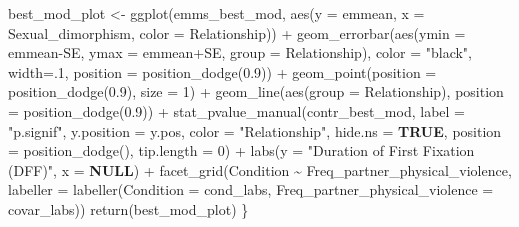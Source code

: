 \documentclass[
  bookmarksnumbered]{article}
\newenvironment{Shaded}{\begin{snugshade}}{\end{snugshade}}
\newcommand{\AttributeTok}[1]{\textcolor[rgb]{0.80,0.80,0.80}{#1}}
\newcommand{\ConstantTok}[1]{\textcolor[rgb]{0.86,0.64,0.64}{\textbf{#1}}}
\newcommand{\DecValTok}[1]{\textcolor[rgb]{0.86,0.86,0.80}{#1}}
\newcommand{\FloatTok}[1]{\textcolor[rgb]{0.75,0.75,0.82}{#1}}
\newcommand{\FunctionTok}[1]{\textcolor[rgb]{0.94,0.94,0.56}{#1}}
\newcommand{\NormalTok}[1]{\textcolor[rgb]{0.80,0.80,0.80}{#1}}
\newcommand{\OtherTok}[1]{\textcolor[rgb]{0.94,0.94,0.56}{#1}}
\newcommand{\SpecialCharTok}[1]{\textcolor[rgb]{0.86,0.64,0.64}{#1}}
\newcommand{\StringTok}[1]{\textcolor[rgb]{0.80,0.58,0.58}{#1}}
\begin{document}
\begin{Shaded}
\begin{Highlighting}[]
\NormalTok{  best\_mod\_plot }\OtherTok{\textless{}{-}} \FunctionTok{ggplot}\NormalTok{(emms\_best\_mod, }
                          \FunctionTok{aes}\NormalTok{(}\AttributeTok{y =}\NormalTok{ emmean, }\AttributeTok{x =}\NormalTok{ Sexual\_dimorphism, }\AttributeTok{color =}\NormalTok{ Relationship)) }\SpecialCharTok{+}
    \FunctionTok{geom\_errorbar}\NormalTok{(}\FunctionTok{aes}\NormalTok{(}\AttributeTok{ymin =}\NormalTok{ emmean}\SpecialCharTok{{-}}\NormalTok{SE,}
                      \AttributeTok{ymax =}\NormalTok{ emmean}\SpecialCharTok{+}\NormalTok{SE,}
                      \AttributeTok{group =}\NormalTok{ Relationship), }
                  \AttributeTok{color =} \StringTok{"black"}\NormalTok{,}
                  \AttributeTok{width=}\NormalTok{.}\DecValTok{1}\NormalTok{,}
                  \AttributeTok{position =} \FunctionTok{position\_dodge}\NormalTok{(}\FloatTok{0.9}\NormalTok{)) }\SpecialCharTok{+}
    \FunctionTok{geom\_point}\NormalTok{(}\AttributeTok{position =} \FunctionTok{position\_dodge}\NormalTok{(}\FloatTok{0.9}\NormalTok{), }\AttributeTok{size =} \DecValTok{1}\NormalTok{) }\SpecialCharTok{+}
    \FunctionTok{geom\_line}\NormalTok{(}\FunctionTok{aes}\NormalTok{(}\AttributeTok{group =}\NormalTok{ Relationship),}
              \AttributeTok{position =} \FunctionTok{position\_dodge}\NormalTok{(}\FloatTok{0.9}\NormalTok{)) }\SpecialCharTok{+} 
    \FunctionTok{stat\_pvalue\_manual}\NormalTok{(contr\_best\_mod, }\AttributeTok{label =} \StringTok{"p.signif"}\NormalTok{, }
                       \AttributeTok{y.position =}\NormalTok{ y.pos,}
                       \AttributeTok{color =} \StringTok{"Relationship"}\NormalTok{, }\AttributeTok{hide.ns =} \ConstantTok{TRUE}\NormalTok{,}
                       \AttributeTok{position =} \FunctionTok{position\_dodge}\NormalTok{(),}
                       \AttributeTok{tip.length =} \DecValTok{0}\NormalTok{) }\SpecialCharTok{+}
    \FunctionTok{labs}\NormalTok{(}\AttributeTok{y =} \StringTok{"Duration of First Fixation (DFF)"}\NormalTok{,}
         \AttributeTok{x =} \ConstantTok{NULL}\NormalTok{) }\SpecialCharTok{+}
    \FunctionTok{facet\_grid}\NormalTok{(Condition }\SpecialCharTok{\textasciitilde{}}\NormalTok{ Freq\_partner\_physical\_violence,}
               \AttributeTok{labeller =} \FunctionTok{labeller}\NormalTok{(}\AttributeTok{Condition =}\NormalTok{ cond\_labs,}
                                   \AttributeTok{Freq\_partner\_physical\_violence =}\NormalTok{ covar\_labs))}
  \FunctionTok{return}\NormalTok{(best\_mod\_plot)}
\NormalTok{\}}
\end{Highlighting}
\end{Shaded}
\end{document}
